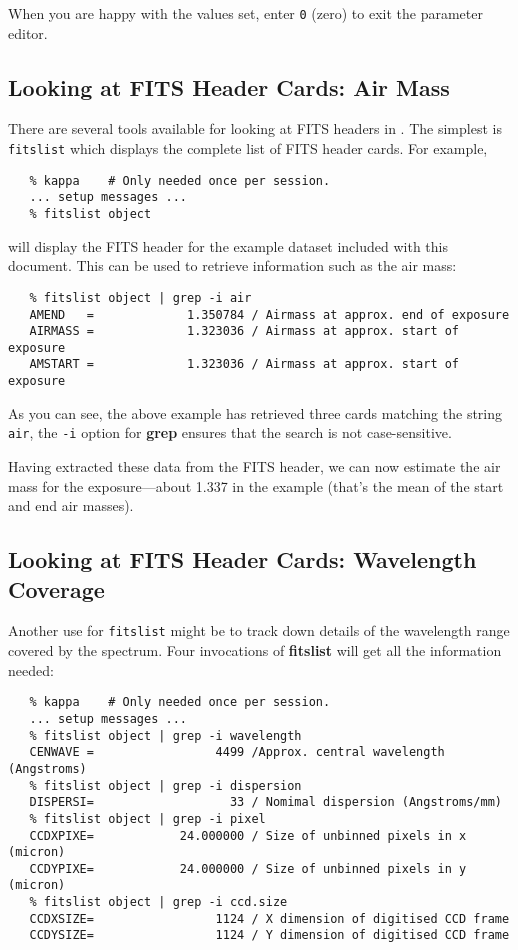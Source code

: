 \documentclass[twoside,11pt]{article}
\newcommand{\xref}[3]{#1}
\newcommand{\xlabel}[1]{}
\newcommand{\mlabel}[1]{\xlabel{#1}\label{#1}}
\newcommand{\scspec}[2]{#1}
\newcommand{\scspec}[2]{#2}
\begin{document}
When you are happy with the values set, enter \verb+0+ (zero) to exit the
parameter editor.


\subsection{\mlabel{cook_airmass}Looking at FITS Header Cards: Air Mass}

There are several tools available for looking at FITS headers in
\xref{{}}{sun95}{}.
The simplest is \xref{{\tt fitslist}}{sun95}{FITSLIST} which displays
the complete list of FITS header cards.  For example,

{
\scspec{\small}{ }
\begin{verbatim}
   % kappa    # Only needed once per session.
   ... setup messages ...
   % fitslist object
\end{verbatim}
}

will display the FITS header for the example dataset included with this
document.  This can be used to retrieve information such as the air mass:

{
\scspec{\small}{ }
\begin{verbatim}
   % fitslist object | grep -i air
   AMEND   =             1.350784 / Airmass at approx. end of exposure
   AIRMASS =             1.323036 / Airmass at approx. start of exposure
   AMSTART =             1.323036 / Airmass at approx. start of exposure
\end{verbatim}
}

As you can see, the above example has retrieved three cards matching the
string \verb+air+, the \verb+-i+ option for {\bf grep} ensures that the
search is not case-sensitive.

Having extracted these data from the FITS header, we can now estimate
the air mass for the exposure\scspec{---}{ - }about 1.337 in the example
(that's the mean of the start and end air masses).


\subsection{\mlabel{cook_wavelength}Looking at FITS Header Cards:
            Wavelength Coverage}

Another use for \xref{{\tt fitslist}}{sun95}{FITSLIST} might be to
track down details of the wavelength range covered by the spectrum.
Four invocations of {\bf fitslist} will get all the information needed:

{
\scspec{\small}{ }
\begin{verbatim}
   % kappa    # Only needed once per session.
   ... setup messages ...
   % fitslist object | grep -i wavelength
   CENWAVE =                 4499 /Approx. central wavelength (Angstroms)
   % fitslist object | grep -i dispersion
   DISPERSI=                   33 / Nomimal dispersion (Angstroms/mm)
   % fitslist object | grep -i pixel
   CCDXPIXE=            24.000000 / Size of unbinned pixels in x (micron)
   CCDYPIXE=            24.000000 / Size of unbinned pixels in y (micron)
   % fitslist object | grep -i ccd.size
   CCDXSIZE=                 1124 / X dimension of digitised CCD frame
   CCDYSIZE=                 1124 / Y dimension of digitised CCD frame
\end{verbatim}
}
\end{document}
